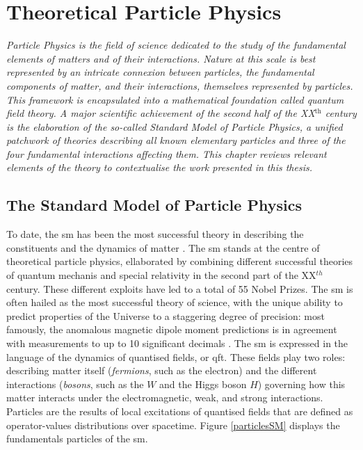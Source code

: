 \chapter{\color{oxfordblue} Theoretical Particle Physics}\label{chap-theory}
\ChapFrame

\textit{Particle Physics is the field of science dedicated to the study of the fundamental elements of matters and of their interactions. Nature at this scale is best represented by an intricate connexion between particles, the fundamental components of matter, and their interactions, themselves represented by particles. This framework is encapsulated into a mathematical foundation called quantum field theory. A major scientific achievement of the second half of the XX$^{\text{th}}$ century is the elaboration of the so-called Standard Model of Particle Physics, a unified patchwork of theories describing all known elementary particles and three of the four fundamental interactions affecting them. This chapter reviews relevant elements of the theory to contextualise the work presented in this thesis.}

\section{The Standard Model of Particle Physics}\label{Section:SM}
To date, the \gls{sm} has been the most successful theory in describing the constituents and the dynamics of matter \cite{SMphysics}. The \gls{sm} stands at the centre of theoretical particle physics, ellaborated by combining different successful theories of quantum mechanis and special relativity in the second part of the XX$^{th}$ century. These different exploits have led to a total of 55 Nobel Prizes. The \gls{sm} is often hailed as the most successful theory of science, with the unique ability to predict properties of the Universe to a staggering degree of precision: most famously, the anomalous magnetic dipole moment predictions is in agreement with measurements to up to 10 significant decimals \cite{PhysRevA.83.052122}. The \gls{sm} is expressed in the language of the dynamics of quantised fields, or \gls{qft}. These fields play two roles: describing matter itself (\textit{fermions}, such as the electron) and the different interactions (\textit{bosons}, such as the $W$ and the Higgs boson $H$) governing how this matter interacts under the electromagnetic, weak, and strong interactions. Particles are the results of local excitations of quantised fields that are defined as operator-values distributions over spacetime. Figure \ref{particlesSM} displays the fundamentals particles of the \gls{sm}. \\

